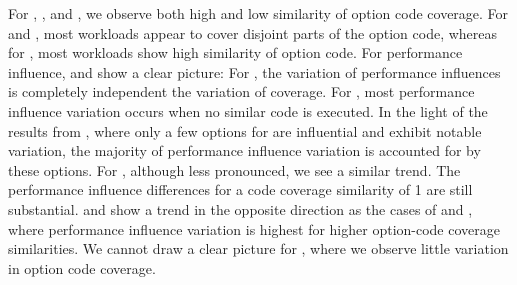 For \batik, \dconvert, and \jumper, we observe both high and low similarity of option code coverage. For \htwo and \jadx, most workloads appear to cover disjoint parts of the option code, whereas for \kanzi, most workloads show high similarity of option code. 
For performance influence, \dconvert and \jadx show a clear picture: For \dconvert, the variation of performance influences is completely independent the variation of coverage. For \jadx, most performance influence variation occurs when no similar code is executed. In the light of the results from , where only a few options for \jadx are influential and exhibit notable variation, the majority of performance influence variation is accounted for by these options. 
For \jumper, although less pronounced, we see a similar trend. The performance influence differences for a code coverage similarity of 1 are still substantial. 
\htwo and \batik show a trend in the opposite direction as the cases of \jadx and \jumper, where performance influence variation is highest for higher option-code coverage similarities. We cannot draw a clear picture for \kanzi, where we observe little variation in option code coverage.
